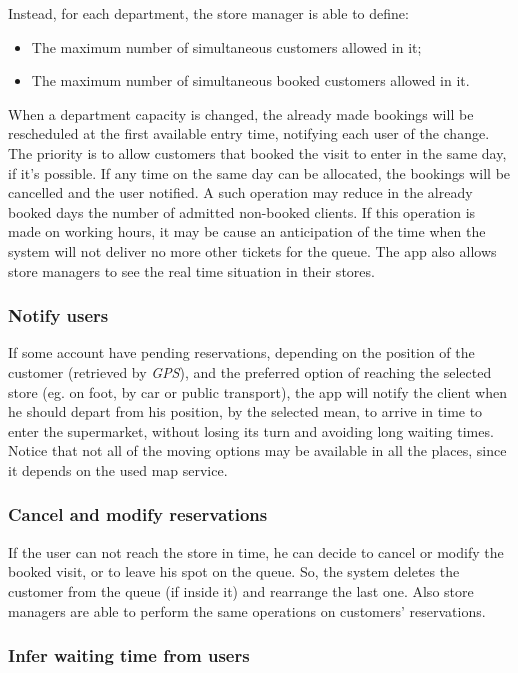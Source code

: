 \documentclass{article}
\begin{document}
		Instead, for each department, the store manager is able to define:
		\begin{itemize}
			\item The maximum number of simultaneous customers allowed in it;
			\item The maximum number of simultaneous booked customers allowed in it.
		\end{itemize}
	 When a department capacity is changed, the already made bookings will be rescheduled at the first available entry time, notifying each user of the change. The priority is to allow customers that booked the visit to enter in the same day, if it's possible. If any time on the same day can be allocated, the bookings will be cancelled and the user notified. A such operation may reduce in the already booked days the number of admitted non-booked clients. If this operation is made on working hours, it may be cause an anticipation of the time when the system will not deliver no more other tickets for the queue.
	 The app also allows store managers to see the real time situation in their stores.
	
		\subsubsection{Notify users}
		
		If some account have pending reservations, depending on the position of the customer (retrieved by \emph{GPS}), and the preferred option of reaching the selected store (eg. on foot, by car or public transport), the app will notify the client when he should depart from his position, by the selected mean, to arrive in time to enter the supermarket, without losing its turn and avoiding long waiting times. Notice that not all of the moving options may be available in all the places, since it depends on the used map service.
		
		\subsubsection{Cancel and modify reservations}
		
		If the user can not reach the store in time, he can decide to cancel or modify the booked visit, or to leave his spot on the queue. So, the system deletes the customer from the queue (if inside it) and rearrange the last one. Also store managers are able to perform the same operations on customers' reservations. 
		
		
		\subsubsection{Infer waiting time from users}
		
\end{document}
